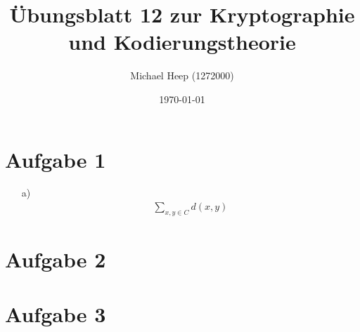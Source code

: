\documentclass[12pt,a4paper]{scrartcl}
\title{Übungsblatt 12 zur Kryptographie und Kodierungstheorie}
\author{Michael Heep (1272000)}
\date{\today}
\begin{document}
\maketitle

\section*{Aufgabe 1}
\begin{enumerate}
\item[a)]
\begin{align*}
\sum_{x,y \in C} d(x,y) 
\end{align*}
\end{enumerate}

\section*{Aufgabe 2}

\section*{Aufgabe 3}
\end{document}
